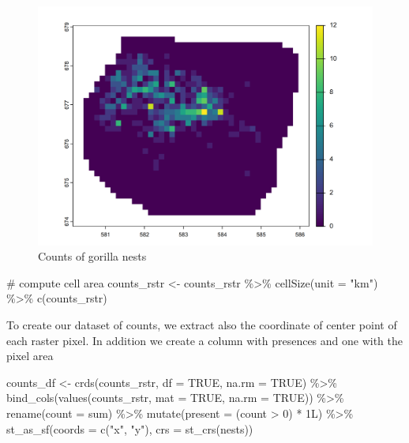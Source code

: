 \documentclass[
  letterpaper,
  DIV=11,
  numbers=noendperiod]{scrartcl}
\newenvironment{Shaded}{\begin{snugshade}}{\end{snugshade}}
\newcommand{\AttributeTok}[1]{\textcolor[rgb]{0.40,0.45,0.13}{#1}}
\newcommand{\CommentTok}[1]{\textcolor[rgb]{0.37,0.37,0.37}{#1}}
\newcommand{\ConstantTok}[1]{\textcolor[rgb]{0.56,0.35,0.01}{#1}}
\newcommand{\DecValTok}[1]{\textcolor[rgb]{0.68,0.00,0.00}{#1}}
\newcommand{\FunctionTok}[1]{\textcolor[rgb]{0.28,0.35,0.67}{#1}}
\newcommand{\NormalTok}[1]{\textcolor[rgb]{0.00,0.23,0.31}{#1}}
\newcommand{\OtherTok}[1]{\textcolor[rgb]{0.00,0.23,0.31}{#1}}
\newcommand{\SpecialCharTok}[1]{\textcolor[rgb]{0.37,0.37,0.37}{#1}}
\newcommand{\StringTok}[1]{\textcolor[rgb]{0.13,0.47,0.30}{#1}}
\begin{document}
\begin{figure}[H]

{\centering \includegraphics[width=0.8\linewidth,height=\textheight,keepaspectratio]{day5_practical_8_files/figure-pdf/unnamed-chunk-65-1.png}

}

\caption{Counts of gorilla nests}

\end{figure}%

\begin{Shaded}
\begin{Highlighting}[]
\CommentTok{\# compute cell area}
\NormalTok{counts\_rstr }\OtherTok{\textless{}{-}}\NormalTok{ counts\_rstr }\SpecialCharTok{\%\textgreater{}\%}
  \FunctionTok{cellSize}\NormalTok{(}\AttributeTok{unit =} \StringTok{"km"}\NormalTok{) }\SpecialCharTok{\%\textgreater{}\%}
  \FunctionTok{c}\NormalTok{(counts\_rstr)}
\end{Highlighting}
\end{Shaded}

To create our dataset of counts, we extract also the coordinate of
center point of each raster pixel. In addition we create a column with
presences and one with the pixel area

\begin{Shaded}
\begin{Highlighting}[]
\NormalTok{counts\_df }\OtherTok{\textless{}{-}} \FunctionTok{crds}\NormalTok{(counts\_rstr, }\AttributeTok{df =} \ConstantTok{TRUE}\NormalTok{, }\AttributeTok{na.rm =} \ConstantTok{TRUE}\NormalTok{) }\SpecialCharTok{\%\textgreater{}\%}
  \FunctionTok{bind\_cols}\NormalTok{(}\FunctionTok{values}\NormalTok{(counts\_rstr, }\AttributeTok{mat =} \ConstantTok{TRUE}\NormalTok{, }\AttributeTok{na.rm =} \ConstantTok{TRUE}\NormalTok{)) }\SpecialCharTok{\%\textgreater{}\%}
  \FunctionTok{rename}\NormalTok{(}\AttributeTok{count =}\NormalTok{ sum) }\SpecialCharTok{\%\textgreater{}\%}
  \FunctionTok{mutate}\NormalTok{(}\AttributeTok{present =}\NormalTok{ (count }\SpecialCharTok{\textgreater{}} \DecValTok{0}\NormalTok{) }\SpecialCharTok{*} \DecValTok{1}\NormalTok{L) }\SpecialCharTok{\%\textgreater{}\%}
  \FunctionTok{st\_as\_sf}\NormalTok{(}\AttributeTok{coords =} \FunctionTok{c}\NormalTok{(}\StringTok{"x"}\NormalTok{, }\StringTok{"y"}\NormalTok{), }\AttributeTok{crs =} \FunctionTok{st\_crs}\NormalTok{(nests))}
\end{Highlighting}
\end{Shaded}
\end{document}
